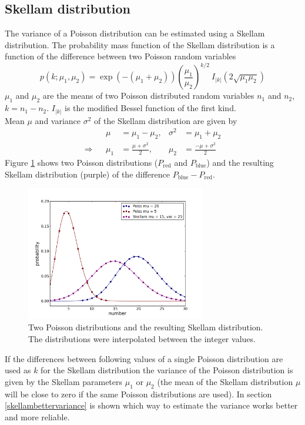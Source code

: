 \subsection{Skellam distribution}\label{skellamdist}
The variance of a Poisson distribution can be estimated using a Skellam distribution.
The probability
mass function of the Skellam distribution is a function of the difference between
two Poisson random variables
\begin{equation}
	p(k;\mu_1, \mu_2) =
	\exp(-(\mu_1+\mu_2))\left(\frac{\mu_1}{\mu_2}\right)^{k/2}~I_{|k|}\left(2\sqrt{\mu_1
	\mu_2}\right)
\end{equation}  
$\mu_1$ and $\mu_2$ are the means of two Poisson distributed random variables $n_1$ and $n_2$, $k = n_1 - n_2$.
$I_{|k|}$ is the modified Bessel function of the first kind.\\
Mean $\mu$ and variance $\sigma^2$ of the Skellam distribution are given by
\begin{align}
	&&\mu &= \mu_1 - \mu_2,& \sigma^2 &= \mu_1 + \mu_2\\
	\Rightarrow &&\mu_1& = \frac{\mu + \sigma^2}{2},& \mu_2 &=\frac{-\mu +
	\sigma^2}{2}
\end{align}
Figure \ref{skellamdistfig} shows two Poisson distributions ($P_\text{red}$ and $P_\text{blue}$) and the resulting Skellam distribution (purple) of the difference $P_\text{blue} - P_\text{red}$.
\begin{figure}
\centering
\includegraphics[width = 0.7\textwidth]{pictures/skellamdist.png}
	\caption{Two Poisson distributions and the resulting Skellam distribution. The distributions were interpolated between the integer values.}
	\label{skellamdistfig}
\end{figure}
If the differences between following values of a single Poisson distribution are used as $k$ for the Skellam distribution the variance of the Poisson distribution is given by the Skellam parameters $\mu_1$ or $\mu_2$ (the mean of the Skellam distribution $\mu$ will be close to zero if the same Poisson distributions are used).\newline
In section \ref{skellambettervariance} is shown which way to estimate the variance works better and more reliable.

